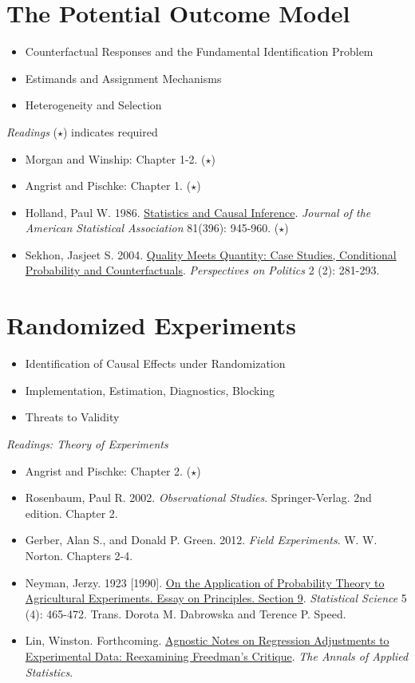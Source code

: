\documentclass{article}
\begin{document}
\section{The Potential Outcome Model}

\begin{itemize}
\item Counterfactual Responses and the Fundamental Identification Problem
\item Estimands and Assignment Mechanisms
\item Heterogeneity and Selection
\end{itemize}

\emph{Readings}
($\star$) indicates required
\begin{itemize}
\item Morgan and Winship: Chapter 1-2. ($\star$)
\item Angrist and Pischke: Chapter 1. ($\star$)
\item Holland, Paul W. 1986.  \href{http://www.jstor.org/stable/2289064} {Statistics and Causal Inference}. \textit{Journal of the American Statistical Association} 81(396): 945-960. ($\star$)
\item Sekhon, Jasjeet S. 2004.  \href{http://journals.cambridge.org/abstract_S1537592704040150} {Quality Meets Quantity: Case Studies, Conditional Probability and Counterfactuals}. \textit{Perspectives on Politics} 2 (2): 281-293.
\end{itemize}


\section{Randomized Experiments}

\begin{itemize}
\item Identification of Causal Effects under Randomization
\item Implementation, Estimation, Diagnostics, Blocking
\item Threats to Validity
\end{itemize}

\emph{Readings: Theory of Experiments}
\begin{itemize}
\item  Angrist and Pischke: Chapter 2. ($\star$)
\item Rosenbaum, Paul R. 2002. \textit{ Observational Studies}. Springer-Verlag. 2nd edition. Chapter 2.
\item Gerber, Alan S., and Donald P. Green. 2012. \textit{Field Experiments}. W. W. Norton. Chapters 2-4.
\item Neyman, Jerzy. 1923 [1990]. \href{http://www.jstor.org/stable/2245382}{On the Application of Probability Theory to Agricultural Experiments. Essay on Principles. Section 9}. \textit{Statistical Science} 5 (4): 465-472. Trans. Dorota M. Dabrowska and Terence P. Speed.
\item Lin, Winston. Forthcoming. \href{http://arxiv.org/pdf/1208.2301.pdf}{Agnostic Notes on Regression Adjustments to Experimental Data: Reexamining Freedman's Critique}. \textit{The Annals of Applied Statistics}.
\end{itemize}
\end{document}
